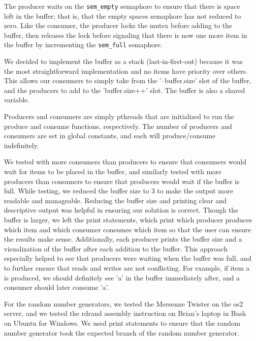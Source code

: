 \documentclass[letterpaper, onecolumn, draftclsnofoot, 10pt, compsoc]{IEEEtran}
\begin{document}
\begin{singlespace}
            The producer waits on the \texttt{sem\_empty} semaphore to ensure that there is space left in the buffer; 
            that is, that the empty spaces semaphore has not reduced to zero.
            Like the consumer, the producer locks the mutex before adding to the buffer, then releases the lock before signaling that there is now one more item in the buffer by incrementing the \texttt{sem\_full} semaphore.\par
            
            We decided to implement the buffer as a stack (last-in-first-out) because it was the most straightforward implementation and no items have priority over others. 
            This allows our consumers to simply take from the '--buffer.size' slot of the buffer, and the producers to add to the 'buffer.size++' slot.
            The buffer is also a shared variable.\par
            
            Producers and consumers are simply pthreads that are initialized to run the produce and consume functions, respectively. 
            The number of producers and consumers are set in global constants, and each will produce/consume indefinitely. \par
            
            We tested with more consumers than producers to ensure that consumers would wait for items to be placed in the buffer, and similarly tested with more producers than consumers to ensure that producers would wait if the buffer is full. 
            While testing, we reduced the buffer size to 3 to make the output more readable and manageable.
            Reducing the buffer size and printing clear and descriptive output was helpful in ensuring our solution is correct. 
            Though the buffer is larger, we left the print statements, which print which producer produces which item and which consumer consumes which item so that the user can ensure the results make sense. 
            Additionally, each producer prints the buffer size and a visualization of the buffer after each addition to the buffer. 
            This approach especially helped to see that producers were waiting when the buffer was full, and to further ensure that reads and writes are not conflicting. 
            For example, if item a is produced, we should definitely see 'a' in the buffer immediately after, and a consumer should later consume 'a'.
            \par

            For the random number generators, we tested the Mersenne Twister on the os2 server, and we tested the rdrand assembly instruction on Brian's laptop in Bash on Ubuntu for Windows. 
            We used print statements to ensure that the random number generator took the expected branch of the random number generator. \par
          

\end{singlespace}
\end{document}
